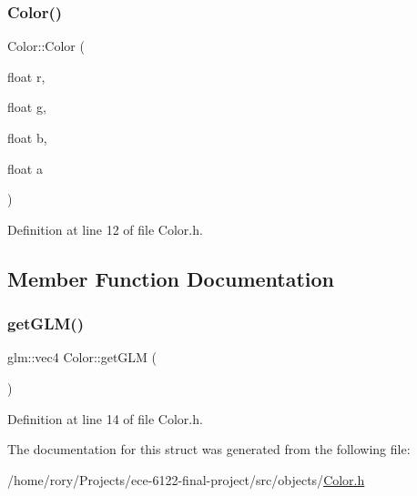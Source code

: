 \subsubsection{\texorpdfstring{Color()}{Color()}\hspace{0.1cm}{\footnotesize\ttfamily [3/3]}}
{\footnotesize\ttfamily Color\+::\+Color (\begin{DoxyParamCaption}\item[{float}]{r,  }\item[{float}]{g,  }\item[{float}]{b,  }\item[{float}]{a }\end{DoxyParamCaption})\hspace{0.3cm}{\ttfamily [inline]}}



Definition at line 12 of file Color.\+h.



\subsection{Member Function Documentation}
\mbox{\label{struct_color_aac52dbc4a7b5b5f500171fa74be323f6}} 
\subsubsection{\texorpdfstring{get\+G\+L\+M()}{getGLM()}}
{\footnotesize\ttfamily glm\+::vec4 Color\+::get\+G\+LM (\begin{DoxyParamCaption}{ }\end{DoxyParamCaption})\hspace{0.3cm}{\ttfamily [inline]}}



Definition at line 14 of file Color.\+h.



The documentation for this struct was generated from the following file\+:\begin{DoxyCompactItemize}
\item 
/home/rory/\+Projects/ece-\/6122-\/final-\/project/src/objects/\hyperlink{_color_8h}{Color.\+h}\end{DoxyCompactItemize}
